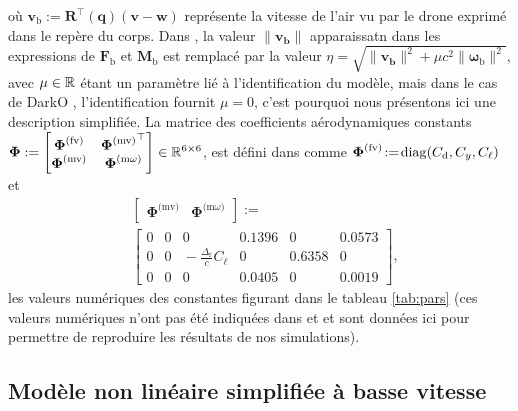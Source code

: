 où $\boldsymbol{v}_{\text{b}} := \boldsymbol{R}^\top(\boldsymbol{q}) (\boldsymbol{v}-\boldsymbol{w})$ représente la vitesse de l'air vu par le drone exprimé dans le repère du corps. Dans \cite{lustosaHal-03035938}, la valeur $\lVert \boldsymbol{v_{\text{b}}} \rVert$ apparaissatn dans les expressions de  $\boldsymbol{F}_{\text{b}}$ et $\boldsymbol{M}_{\text{b}}$ est remplacé par la valeur $\eta = \sqrt{\lVert \boldsymbol{v_{\text{b}}} \rVert^{2} + \mu c^{2} \lVert \boldsymbol{\omega}_{\text{b}} \rVert^{2}}$, avec $\mu \in {\mathbb R}$ étant un paramètre lié à l'identification du modèle, mais dans le cas de DarkO \cite{sansouStage}, l'identification fournit $\mu = 0$, c'est pourquoi nous présentons ici une description simplifiée. La matrice des coefficients aérodynamiques constants 
$\boldsymbol{\Phi}:= \begin{bmatrix} \boldsymbol{\Phi}^{\text{(fv)}} & {\boldsymbol{\Phi}^{\text{(mv)}}}^\top \\ \boldsymbol{\Phi}^{\text{(mv)}} & \boldsymbol{\Phi}^{\text{(m$\omega$)}} \end{bmatrix} \in {\mathbb R}^{6 \times 6}$, est défini dans \cite[eqs. (6)--(9)]{olszaneckibarthHal-02542982} comme $ \boldsymbol{\Phi}^{\text{(fv)}} \!:=\! \operatorname{diag}(C_{\text{d}},C_{y}, C_{\ell})$ et
\begin{align*}
&\left[ \begin{array}{c|c}
    \boldsymbol{\Phi}^{\text{(mv)}}  &  \boldsymbol{\Phi}^{\text{(m$\omega$)}} 
\end{array}\right] :=\\ 
&\left[ \begin{array}{ccc|ccc}
    0 & 0 & 0    &                                          0.1396 & 0 & 0.0573 \\
    0 & 0 & \!\!\!\!\! -\frac{\Delta_{\text{r}}}{c}C_{\ell} &    0 &  0.6358  & 0 \\
    0 & 0 & 0 &     0.0405 & 0 & 0.0019 
\end{array}\right],
\end{align*}
les valeurs numériques des constantes figurant dans le tableau \ref{tab:pars} (ces valeurs numériques n'ont pas été indiquées dans \cite{lustosaHal-03035938} et \cite{olszaneckibarthHal-02542982} et sont données ici pour permettre de reproduire les résultats de nos simulations). 


\subsection{Modèle non linéaire simplifiée à basse vitesse}

